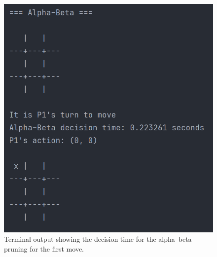 \documentclass[11pt]{article}
\begin{document}
\begin{figure}[H]
\begin{minipage}[b]{0.48\textwidth}
        \includegraphics[width=\textwidth]{Images/tic_tac_toe_decision_time_alphabeta}
        \caption{Terminal output showing the decision time for the alpha--beta pruning for the first move.}
        \label{fig:tic_tac_toe_decision_time_alphabeta}
    \end{minipage}
\end{figure}
\end{document}
